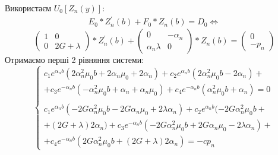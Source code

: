 Використаєм $U_0\left[ Z_n(y) \right]$:
\begin{eqnarray*}
    E_0 * Z_n^{'}(b) + F_0 * Z_n(b) = D_0 \Leftrightarrow
\end{eqnarray*}
\begin{equation*}
    \begin{pmatrix}
        1 & 0 \\
        0 & 2G + \lambda
    \end{pmatrix} * Z_n^{'}(b) + \begin{pmatrix}
        0 & -\alpha_n \\
        \alpha_n \lambda & 0
    \end{pmatrix} * Z_n(b) = \begin{pmatrix}
        0 \\
        -p_n
    \end{pmatrix}
\end{equation*}
Отримаємо перші 2 рівняння системи:
\begin{equation*}
    \begin{cases}
        c_1 e^{\alpha_n b} (2\alpha_n^2 \mu_0 b + 2\alpha_n \mu_0 + 2\alpha_n) + c_2 e^{\alpha_n b} (2\alpha_n^2 \mu_0 b - 2\alpha_n) + \\
        + c_3 e^{-\alpha_n b} (-\alpha_n^2 \mu_0 b + \alpha_n + \alpha_n \mu_0) + c_4 e^{-\alpha_n b} (\alpha_n^2 \mu_0 b + \alpha_n) = 0 \\
        \\
        c_1 e^{\alpha_n b} (-2 G \alpha_n^2 \mu_0 b - 2 G \alpha_n \mu_0 + 2 \lambda \alpha_n) + c_2 e^{\alpha_n b} (-2G \alpha_n^2 \mu_0 b + \\
        + (2G + \lambda) 2 \alpha_n) + c_3  e^{-\alpha_n b} (-2 G \alpha_n^2 \mu_0 b + 2G \alpha_n \mu_0 - 2\lambda \alpha_n) + \\ 
        + c_4 e^{-\alpha_n b} (2G \alpha_n^2 \mu_0 b + (2G + \lambda) 2 \alpha_n) = -c p_n
    \end{cases}
\end{equation*}

